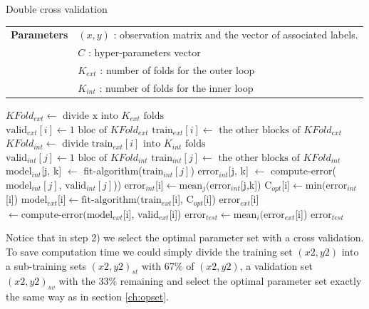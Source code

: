 \documentclass[a4paper,12pt,oneside,final]{report}
\begin{document}
\begin{algorithm}[H]
     \caption{\small Double cross validation}
     \label{alg:double_cross_val} 
     \begin{algorithmic}
       \STATE \begin{tabular}{@{\hspace{0cm}}p{1.4cm}l}
       \textbf{Parameters}  & $(x, y)$ : observation matrix and the vector of associated labels.\\
           & $C$ : hyper-parameters vector\\
           & $K_{ext}$ : number of folds for the outer loop\\
           & $K_{int}$ : number of folds for the inner loop\\
       \end{tabular}
       \STATE $KFold_{ext} \leftarrow \text{ divide x into } K_{ext} \text{ folds}$\\
         \STATE $\text{valid}_{ext}[i] \leftarrow 1 \text{ bloc of } KFold_{ext}$
         \STATE $\text{train}_{ext}[i] \leftarrow \text{ the other blocks of } KFold_{ext}$
         \STATE $KFold_{int} \leftarrow \text{ divide train}_{ext}[i] \text{ into } K_{int} \text{ folds}$\\
            \STATE $\text{valid}_{int}[j] \leftarrow 1 \text{ bloc of } KFold_{int}$
            \STATE $\text{train}_{int}[j] \leftarrow \text{ the other blocks of } KFold_{int}$
               \STATE $\text{model}_{int}$[j, k] $\leftarrow$ fit-algorithm($\text{train}_{int}[j]$)
               \STATE $\text{error}_{int}$[j, k] $\leftarrow$ compute-error($\text{model}_{int}[j]$, $\text{valid}_{int}[j]$))
            \ENDFOR
         \ENDFOR
         \STATE $\text{error}_{int}$[i]$ \leftarrow  \text{mean}_j( \text{error}_{int}$[j,k])
         \STATE $\text{C}_{opt}$[i]$     \leftarrow  \text{min}( \text{error}_{int}$[i])
         \STATE $\text{model}_{ext}$[i]$ \leftarrow  \text{fit-algorithm}( \text{train}_{ext}$[i], $\text{C}_{opt}$[i])
         \STATE $\text{error}_{ext}$[i]$ \leftarrow  \text{compute-error}( \text{model}_{ext}$[i], $\text{valid}_{ext}$[i])
     \ENDFOR 
     \STATE $\text{error}_{test} \leftarrow  \text{mean}_i( \text{error}_{ext}$[i])
     \RETURN $\text{error}_{test}$ 
     \end{algorithmic}
   \end{algorithm}

Notice that in step 2) we select the optimal parameter set with a cross validation. To save computation time we could simply divide the training set $(x2,y2)$ into a sub-training sets $(x2,y2)_{st}$ with $67\%$ of $(x2,y2)$, a validation set $(x2,y2)_{sv}$ with the $33\%$ remaining and select the optimal parameter set exactly the same way as in section \ref{ch:opset}.
\end{document}
